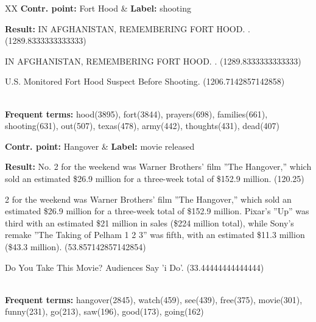 \begin{table*}
\begin{tabularx}{\textwidth}{XX}
\textbf{Contr. point:} Fort Hood & \textbf{Label:} shooting \\
{\textbf{Result:} 
IN AFGHANISTAN, REMEMBERING FORT HOOD. . (1289.8333333333333)

IN AFGHANISTAN, REMEMBERING FORT HOOD. . (1289.8333333333333)

U.S. Monitored Fort Hood Suspect Before Shooting. (1206.7142857142858)
} \\
{\textbf{Frequent terms:} hood(3895), fort(3844), prayers(698), families(661), shooting(631), out(507), texas(478), army(442), thoughts(431), dead(407)}\\
\hline

\textbf{Contr. point:} Hangover & \textbf{Label:} movie released \\
{\textbf{Result:} 
No. 2 for the weekend was Warner Brothers' film ''The Hangover,'' which sold an
estimated \$26.9 million for a three-week total of \$152.9 million. (120.25)

2 for the weekend was Warner Brothers' film ''The Hangover,'' which sold an
estimated \$26.9 million for a three-week total of \$152.9 million. Pixar's
''Up'' was third with an estimated \$21 million in sales (\$224 million total),
while Sony's remake ''The Taking of Pelham 1 2 3'' was fifth, with an estimated
\$11.3 million (\$43.3 million). (53.857142857142854)

Do You Take This Movie? Audiences Say 'i Do'. (33.44444444444444)
} \\
{\textbf{Frequent terms:} 
hangover(2845), watch(459), see(439), free(375), movie(301), funny(231), go(213), saw(196), good(173), going(162)}\\
\hline



\end{tabularx}
\end{table*}
